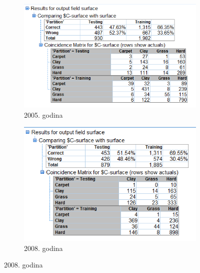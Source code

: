 \documentclass[a4paper]{article}
\begin{document}
\begin{figure}[H]
	\begin{subfigure}[h]{\textwidth}
		\begin{center}
			\includegraphics[scale=0.50]{Klasifikacija/C50/Analysis_Surface2005.png}
		\end{center}
		\caption{2005. godina}
		\label{fig:MatricaKnfuzijeC502005}
	\end{subfigure}

	\vspace{0.5cm}
	\begin{subfigure}[h]{\textwidth}
		\begin{center}
			\includegraphics[scale=0.45]{Klasifikacija/C50/Analysis_Surface2008.png}
		\end{center}
		\caption{2008. godina}
		\label{fig:MatricaKnfuzijeC502008}
	\end{subfigure}
	

\end{figure}
\end{document}
